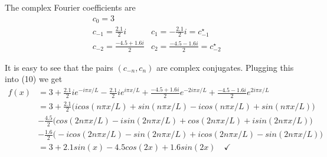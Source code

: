 \documentclass[10pt]{article}
\theoremstyle{remark}
\begin{document}
The complex Fourier coefficients are
\begin{align*}
	& c_0 = 3 & \\
	& c_{-1} = \frac{2.1}{2}i & c_1 = -\frac{2.1}{2}i = c_{-1}^\star \\
	& c_{-2} = \frac{-4.5 + 1.6i}{2} & c_2 = \frac{-4.5 - 1.6i}{2} = c_{-2}^\star
\end{align*}

It is easy to see that the pairs $(c_{-n}, c_n)$ are complex conjugates. Plugging this into (10) we get
\begin{align*}
	f(x) & = 3 + \frac{2.1}{2}ie^{-i\pi x/L} - \frac{2.1}{2}ie^{i\pi x/L} + \frac{-4.5 + 1.6i}{2}e^{-2i\pi x/L} + \frac{-4.5 - 1.6i}{2}e^{2i\pi x/L} \\
	 & = 3 + \frac{2.1}{2}\bigg(icos(n\pi x/L) + sin(n\pi x/L) - icos(n\pi x/L) + sin(n\pi x/L)\bigg) \\ 
	 & - \frac{4.5}{2}\bigg(cos(2n\pi x/L) - isin(2n\pi x/L) + cos(2n\pi x/L) + isin(2n\pi x/L)\bigg) \\
	 & -\frac{1.6}{2}\bigg(-icos(2n\pi x/L) - sin(2n\pi x/L) + icos(2n\pi x/L) - sin(2n\pi x/L)\bigg) \\
	 & = 3 + 2.1sin(x) - 4.5cos(2x) + 1.6sin(2x) \quad \checkmark
\end{align*}
\end{document}
